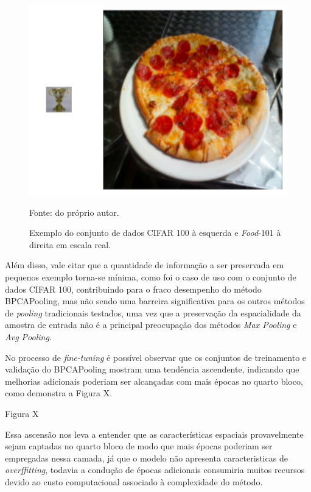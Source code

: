\begin{figure}[H]
    \centering
    \caption{Exemplo do conjunto de dados CIFAR 100 à esquerda e \textit{Food}-101 à direita em escala real.}
    \label{results:fig:datasets:1}
    \includegraphics[width=1\textwidth]{recursos/imagens/project/dataset_diff.png}

    Fonte: do próprio autor.
\end{figure}

Além disso, vale citar que a quantidade de informação a ser preservada em pequenos exemplo torna-se mínima, como foi o caso de uso com o conjunto de dados CIFAR 100, contribuindo para o fraco desempenho do método BPCAPooling, mas não sendo uma barreira significativa para os outros métodos de \textit{pooling} tradicionais testados, uma vez que a preservação da espacialidade da amostra de entrada não é a principal preocupação dos métodos \textit{Max Pooling} e \textit{Avg Pooling}.

No processo de \textit{fine-tuning} é possível observar que os conjuntos de treinamento e validação do BPCAPooling mostram uma tendência ascendente, indicando que melhorias adicionais poderiam ser alcançadas com mais épocas no quarto bloco, como demonstra a Figura X.

Figura X

Essa ascensão nos leva a entender que as características espaciais provavelmente sejam captadas no quarto bloco de modo que mais épocas poderiam ser empregadas nessa camada, já que o modelo não apresenta caracteristicas de \textit{overffitting}, todavia a condução de épocas adicionais consumiria muitos recursos devido ao custo computacional associado à complexidade do método.

